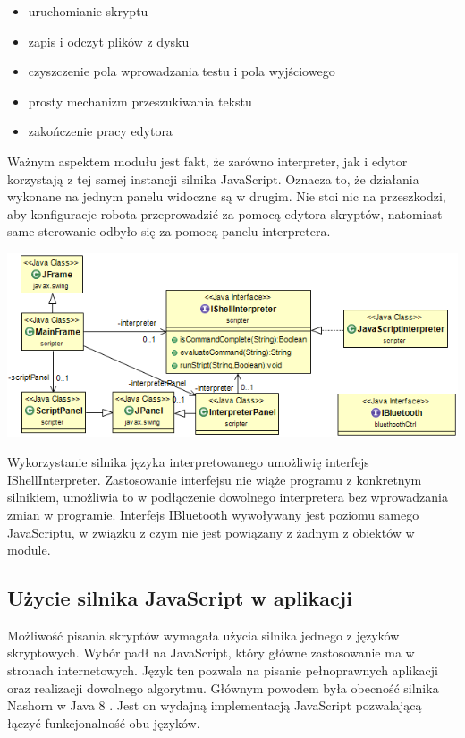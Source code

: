 \documentclass[eng,printmode]{mgr}
\begin{document}
\begin{itemize}
 \item uruchomianie skryptu
 \item zapis i odczyt plików z dysku
 \item czyszczenie pola wprowadzania testu i pola wyjściowego
 \item prosty mechanizm przeszukiwania tekstu
 \item zakończenie pracy edytora
\end{itemize}

Ważnym aspektem modułu jest fakt, że zarówno interpreter, jak i edytor korzystają z tej samej instancji silnika JavaScript. Oznacza to, że działania wykonane na jednym panelu widoczne są w drugim. Nie stoi nic na przeszkodzi, aby konfiguracje robota przeprowadzić za pomocą edytora skryptów, natomiast same sterowanie odbyło się za pomocą panelu interpretera.

   \begin{center}
    \includegraphics[width=1\textwidth]{images/script}
   \end{center}

Wykorzystanie silnika języka interpretowanego umożliwię interfejs IShellInterpreter. Zastosowanie interfejsu nie wiąże programu z konkretnym silnikiem, umożliwia to w podłączenie dowolnego interpretera bez wprowadzania zmian w programie. Interfejs IBluetooth wywoływany jest poziomu samego JavaScriptu, w związku z czym nie jest powiązany z żadnym z obiektów w module.   

   \subsection{Użycie silnika JavaScript w aplikacji}

Możliwość pisania skryptów wymagała użycia silnika jednego z języków skryptowych. Wybór padł na JavaScript, który główne zastosowanie ma w stronach internetowych. Język ten pozwala na pisanie pełnoprawnych aplikacji oraz realizacji dowolnego algorytmu. Głównym powodem była obecność silnika Nashorn w Java 8 . Jest on wydajną implementacją JavaScript pozwalającą łączyć funkcjonalność obu języków. 
\end{document}
